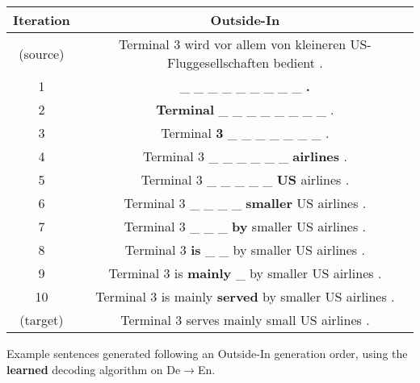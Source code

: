 \centering
\footnotesize
\begin{tabular}{cc}
\toprule
Iteration & {\color{red} Outside-In} \\
\midrule
(source) & Terminal 3 wird vor allem von kleineren US-Fluggesellschaften bedient .\\
1 & \_ \_ \_ \_ \_ \_ \_ \_ \_ \textbf{.} \\
2 & \textbf{Terminal} \_ \_ \_ \_ \_ \_ \_ \_ . \\
3 & Terminal \textbf{3} \_ \_ \_ \_ \_ \_ \_ . \\
4 & Terminal 3 \_ \_ \_ \_ \_ \_ \textbf{airlines} . \\
5 & Terminal 3 \_ \_ \_ \_ \_ \textbf{US} airlines . \\
6 & Terminal 3 \_ \_ \_ \_ \textbf{smaller} US airlines . \\
7 & Terminal 3 \_ \_ \_ \textbf{by} smaller US airlines . \\
8 & Terminal 3 \textbf{is} \_ \_ by smaller US airlines . \\
9 & Terminal 3 is \textbf{mainly} \_ by smaller US airlines . \\
10 & Terminal 3 is mainly \textbf{served} by smaller US airlines . \\
(target) & Terminal 3 serves mainly small US airlines . \\

\bottomrule
\end{tabular}

\caption{Example sentences generated following an {\color{red} Outside-In} generation order, using the \textbf{learned} decoding algorithm on De$\rightarrow$En.}
